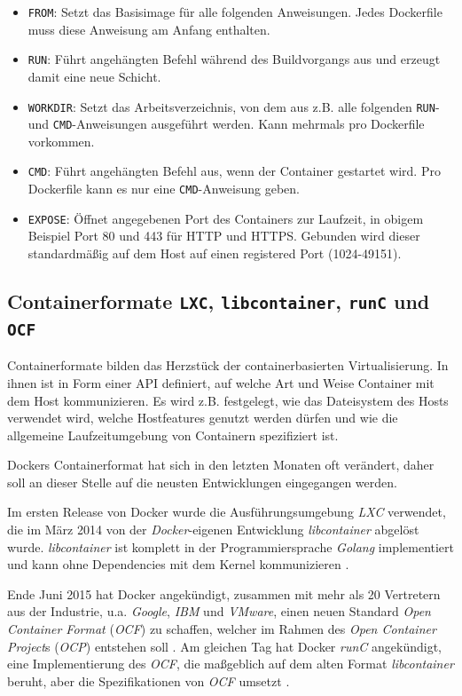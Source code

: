 \documentclass[../main.tex]{subfiles}
\begin{document}
			\begin{itemize}
				\item \texttt{FROM}: Setzt das Basisimage für alle folgenden Anweisungen. Jedes Dockerfile muss diese Anweisung am Anfang enthalten.
				\item \texttt{RUN}: Führt angehängten Befehl während des \gls{Build}vorgangs aus und erzeugt damit eine neue Schicht.
				\item \texttt{WORKDIR}: Setzt das Arbeitsverzeichnis, von dem aus z.B. alle folgenden \texttt{RUN}- und \texttt{CMD}-Anweisungen ausgeführt werden. Kann mehrmals pro Dockerfile vorkommen.
				\item \texttt{CMD}: Führt angehängten Befehl aus, wenn der Container gestartet wird. Pro Dockerfile kann es nur eine \texttt{CMD}-Anweisung geben.
				\item \texttt{EXPOSE}: Öffnet angegebenen Port des Containers zur Laufzeit, in obigem Beispiel Port 80 und 443 für \acrshort{HTTP} und \acrshort{HTTPS}. Gebunden wird dieser standardmäßig auf dem Host auf einen \glqq{}registered\grqq{} Port (1024-49151).
			\end{itemize}

		\subsection{Containerformate \texttt{LXC}, \texttt{libcontainer}, \texttt{runC} und \texttt{OCF}}
		\label{dockerContainerformate}
			Containerformate bilden das Herzstück der containerbasierten Virtualisierung. In ihnen ist in Form einer \acrshort{API} definiert, auf welche Art und Weise Container mit dem Host kommunizieren. Es wird z.B. festgelegt, wie das Dateisystem des Hosts verwendet wird, welche Hostfeatures genutzt werden dürfen und wie die allgemeine Laufzeitumgebung von Containern spezifiziert ist.

			Dockers Containerformat hat sich in den letzten Monaten oft verändert, daher soll an dieser Stelle auf die neusten Entwicklungen eingegangen werden.

			Im ersten Release von Docker wurde die Ausführungsumgebung \emph{LXC} verwendet, die im März 2014 von der \emph{Docker}-eigenen Entwicklung \emph{libcontainer} abgelöst wurde. \emph{libcontainer} ist komplett in der Programmiersprache \emph{Golang} implementiert und kann ohne Dependencies mit dem Kernel kommunizieren \cite{dockerLibcontainer}.

			Ende Juni 2015 hat Docker angekündigt, zusammen mit mehr als 20 Vertretern aus der Industrie, u.a. \emph{Google}, \emph{IBM} und \emph{VMware}, einen neuen Standard \emph{Open Container Format} (\emph{\acrshort{OCF}}) zu schaffen, welcher im Rahmen des \emph{Open Container Project}s (\emph{\acrshort{OCP}}) entstehen soll \cite{dockerOCP}. Am gleichen Tag hat Docker \emph{runC} angekündigt, eine Implementierung des \emph{\acrshort{OCF}}, die maßgeblich auf dem alten Format \emph{libcontainer} beruht, aber die Spezifikationen von \emph{\acrshort{OCF}} umsetzt \cite{dockerRunC}\cite{dockerRunCGithub}\cite{runC}.
\end{document}
